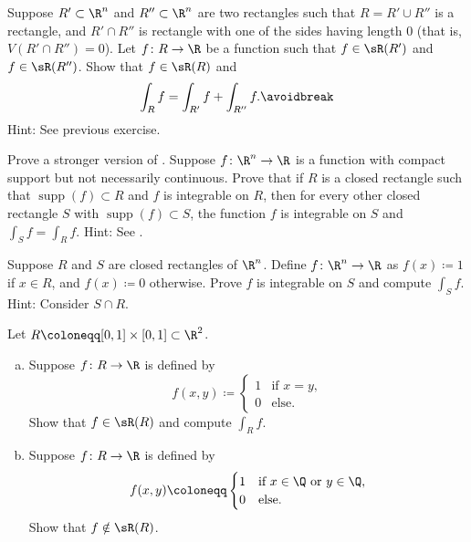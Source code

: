 \begin{exercise}
Suppose $R' \subset \R^n$ and $R'' \subset \R^n$ are two rectangles
such that $R = R' \cup R''$ is a rectangle, and $R' \cap R''$ is rectangle
with one of the sides having length 0 (that is, $V(R' \cap R'') = 0$).
Let $f \colon R \to \R$ be a function such that $f \in \sR(R')$ and
$f \in \sR(R'')$.  Show that $f \in \sR(R)$ and
\begin{equation*}
\int_{R} f = \int_{R'} f + \int_{R''} f .
\avoidbreak
\end{equation*}
Hint: See previous exercise.
\end{exercise}

\begin{exercise}
Prove a stronger version of .
Suppose $f \colon \R^n \to \R$ is a function with compact support but not
necessarily continuous.
Prove that
if $R$ is a closed rectangle such that $\operatorname{supp}(f) \subset R$
and $f$ is integrable on $R$, then for every other closed rectangle
$S$ with $\operatorname{supp}(f) \subset S$,
the function $f$ is integrable on $S$ and
$\int_S f = \int_R f$.
Hint: See .
\end{exercise}

\begin{exercise}
Suppose $R$ and $S$ are closed rectangles of $\R^n$.
Define $f \colon \R^n \to \R$ as $f(x) \coloneqq 1$ if 
$x \in R$, and $f(x) \coloneqq 0$ otherwise.  Prove $f$ is integrable on $S$
and compute $\int_S f$.  Hint: Consider $S \cap R$.
\end{exercise}

\begin{samepage}
\begin{exercise}
Let $R \coloneqq [0,1] \times [0,1] \subset \R^2$.
\begin{enumerate}[a)]
\item
Suppose $f \colon R \to \R$ is defined by
\begin{equation*}
f(x,y) \coloneqq 
\begin{cases}
1 & \text{if } x = y, \\
0 & \text{else.}
\end{cases}
\end{equation*}
Show that $f \in \sR(R)$ and compute $\int_R f$.
\item
Suppose $f \colon R \to \R$ is defined by
\begin{equation*}
f(x,y) \coloneqq 
\begin{cases}
1 & \text{if } x \in \Q \text{ or } y \in \Q, \\
0 & \text{else.}
\end{cases}
\end{equation*}
Show that $f \notin \sR(R)$.
\end{enumerate}
\end{exercise}
\end{samepage}

